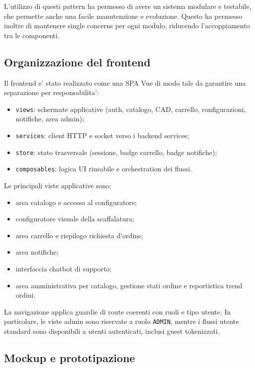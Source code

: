 L'utilizzo di questi pattern ha permesso di avere un sistema modulare e testabile, che permette anche una facile manutenzione e evoluzione. 
Questo ha permesso inoltre di mantenere single concerns per ogni modulo, riducendo l'accoppiamento tra le componenti.

\subsection{Organizzazione del frontend}

Il frontend e' stato realizzato come una SPA Vue di modo tale da garantire una separazione per responsabilita':

\begin{itemize}
	\item \texttt{views}: schermate applicative (auth, catalogo, CAD, carrello, configurazioni, notifiche, area admin);
	\item \texttt{services}: client HTTP e socket verso i backend services;
	\item \texttt{store}: stato trasversale (sessione, badge carrello, badge notifiche);
	\item \texttt{composables}: logica UI riusabile e orchestration dei flussi.
\end{itemize}

Le principali viste applicative sono:

\begin{itemize}
	\item area catalogo e accesso al configuratore;
	\item configuratore visuale della scaffalatura;
	\item area carrello e riepilogo richiesta d'ordine;
	\item area notifiche;
	\item interfaccia chatbot di supporto;
	\item area amministrativa per catalogo, gestione stati ordine e reportistica trend ordini.
\end{itemize}

La navigazione applica guardie di route coerenti con ruoli e tipo utente. In particolare, le viste admin sono riservate a ruolo \texttt{ADMIN}, mentre i flussi utente standard sono disponibili a utenti autenticati, inclusi guest tokenizzati.

\subsection{Mockup e prototipazione}

